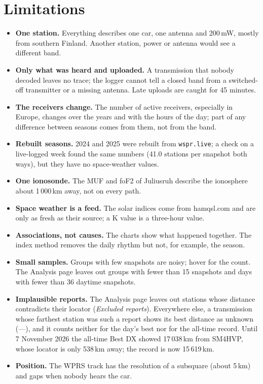 \documentclass[10pt,a4paper]{article}
\begin{document}
\section{Limitations}\label{sec:limits}
\begin{itemize}[leftmargin=1.2em]
\item \textbf{One station.} Everything describes one car, one antenna and 200\,mW, mostly from southern Finland. Another station, power or antenna would see a different band.
\item \textbf{Only what was heard and uploaded.} A transmission that nobody decoded leaves no trace; the logger cannot tell a closed band from a switched-off transmitter or a missing antenna. Late uploads are caught for 45 minutes.
\item \textbf{The receivers change.} The number of active receivers, especially in Europe, changes over the years and with the hours of the day; part of any difference between seasons comes from them, not from the band.
\item \textbf{Rebuilt seasons.} 2024 and 2025 were rebuilt from \texttt{wspr.live}; a check on a live-logged week found the same numbers (41.0 stations per snapshot both ways), but they have no space-weather values.
\item \textbf{One ionosonde.} The MUF and foF2 of Juliusruh describe the ionosphere about 1\,000\,km away, not on every path.
\item \textbf{Space weather is a feed.} The solar indices come from hamqsl.com and are only as fresh as their source; a K value is a three-hour value.
\item \textbf{Associations, not causes.} The charts show what happened together. The index method removes the daily rhythm but not, for example, the season.
\item \textbf{Small samples.} Groups with few snapshots are noisy; hover for the count. The Analysis page leaves out groups with fewer than 15 snapshots and days with fewer than 36 daytime snapshots.
\item \textbf{Implausible reports.} The Analysis page leaves out stations whose distance contradicts their locator (\emph{Excluded reports}). Everywhere else, a transmission whose farthest station was such a report shows its best distance as unknown (---), and it counts neither for the day's best nor for the all-time record. Until 7 November 2026 the all-time Best DX showed 17\,038\,km from SM4HVP, whose locator is only 538\,km away; the record is now 15\,619\,km.
\item \textbf{Position.} The WPRS track has the resolution of a subsquare (about 5\,km) and gaps when nobody hears the car.
\end{itemize}
\end{document}
